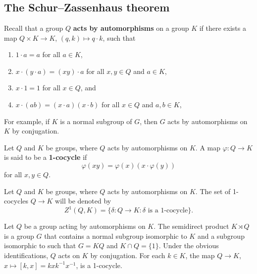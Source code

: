 \section{}

\subsection{The Schur--Zassenhaus theorem}


Recall that a group $Q$ \textbf{acts by automorphisms} on a group $K$ if 
there exists a map $Q\times K\to K$, $(q,k)\mapsto q\cdot k$, 
such that 
\begin{enumerate}
    \item $1\cdot a=a$ for all $a\in K$, 
    \item $x\cdot (y\cdot a)=(xy)\cdot a$ for all $x,y\in Q$ and $a\in K$, 
    \item $x\cdot 1=1$ for all $x\in Q$, and 
    \item $x\cdot (ab)=(x\cdot a)(x\cdot b)$ for all $x\in Q$ and $a,b\in K$, 
\end{enumerate}
For example, if $K$ is a normal subgroup of $G$, 
then $G$ acts by automorphisms on $K$ by conjugation. 

\begin{definition}
Let $Q$ and $K$ be groups, where $Q$ acts by automorphisms on $K$. 
A map 
$\varphi\colon Q\to K$ is said to be a \textbf{1-cocycle} if 
\[
	\varphi(xy)=\varphi(x)(x\cdot\varphi(y))
\]
for all $x,y\in Q$.  
\end{definition}

Let $Q$ and $K$ be groups, where $Q$ acts by automorphisms on $K$. 
The set of 1-cocycles $Q\to K$ will be denoted by 
\[
Z^1(Q,K)=\{\delta\colon Q\to K:\text{$\delta$ is a 1-cocycle}\}.
\]

\begin{example}
Let $Q$ be a group acting by automorphisms on $K$. 
The semidirect product $K\rtimes Q$ 
is a group $G$ that contains a normal subgroup isomorphic to $K$ 
and a subgroup isomorphic to such that 
$G=KQ$ and $K\cap Q=\{1\}$. Under the obvious identifications, 
$Q$ acts on $K$ by conjugation. For each $k\in K$, the map 
$Q\to K$, $x\mapsto [k,x]=kxk^{-1}x^{-1}$, is a 1-cocycle. 
\end{example}

